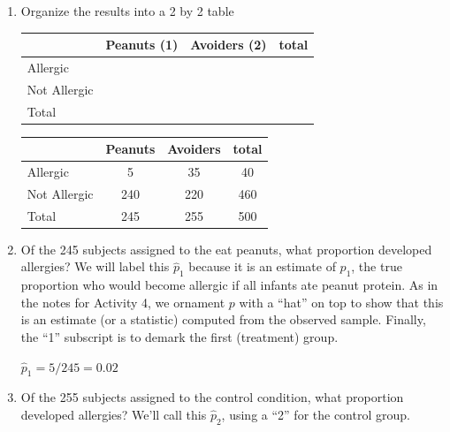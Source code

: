 \begin{enumerate}
  \item \label{PnutTable} Organize the results into a 2 by 2 table
\begin{students}

{\Large
    \begin{tabular}[c]{|l|c|c|c|} \hline
        &Peanuts (1) & Avoiders (2) & total \\ \hline
Allergic    &   &   & \\ \hline
Not Allergic&   &   & \\ \hline
Total & & & \\ \hline
    \end{tabular} 
}
\end{students}
\begin{key}

\begin{tabular}[c]{|l|c|c|c|} \hline
        &Peanuts & Avoiders & total \\ \hline
Allergic& 5  & 35  &  40\\ \hline
Not Allergic& 240  &  220 &460 \\ \hline
Total & 245  &  255 & 500\\ \hline
\end{tabular}
\end{key}

\item Of the 245 subjects assigned to the eat peanuts, what proportion
  developed allergies? We will label this 
     $\widehat{p}_1$ because it is an estimate of $p_1$,  the true proportion
     who would become allergic if all infants ate peanut protein.  As
     in the notes for Activity 4,  we ornament $p$ with a ``hat'' on top to
     show that this is an estimate (or 
     a statistic) computed from the observed sample.  Finally, the ``1''
     subscript is to demark the first (treatment) group.
\begin{students}
\vspace{2cm}
\end{students}

\begin{key}
  {\it $\widehat{p}_1 = 5/245 = 0.02$ }
\end{key}



   \item  Of the 255 subjects assigned to the control condition, what
     proportion developed allergies? We'll call this $\widehat{p}_2$, using a ``2''
     for the control group. 
\begin{students}
\vspace{2cm}
\end{students}


\end{enumerate}
